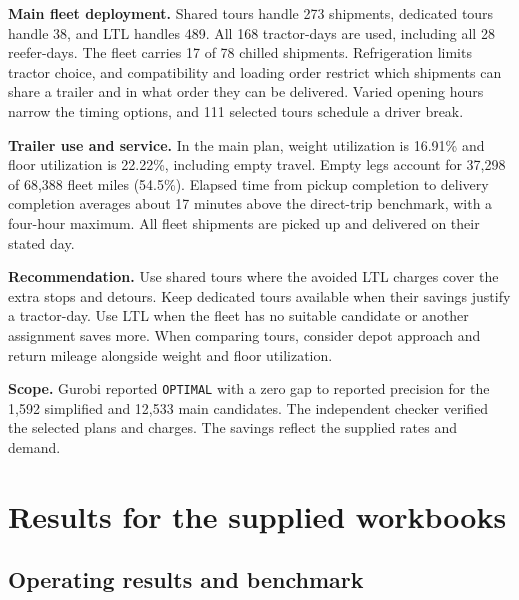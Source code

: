 \documentclass[11pt,letterpaper]{article}
\newcommand{\code}[1]{\texttt{#1}}
\begin{document}
\textbf{Main fleet deployment.} Shared tours handle 273 shipments,
dedicated tours handle 38, and LTL handles 489. All 168 tractor-days
are used, including all 28 reefer-days. The fleet carries 17 of 78
chilled shipments. Refrigeration limits tractor choice, and
compatibility and loading order restrict which shipments can share
a trailer and in what order they can be delivered. Varied opening
hours narrow the timing options, and 111 selected tours schedule a
driver break.

\textbf{Trailer use and service.} In the main plan, weight utilization
is 16.91\% and floor utilization is 22.22\%, including empty travel.
Empty legs account for 37,298 of 68,388 fleet miles (54.5\%).
Elapsed time from pickup completion to delivery completion averages
about 17 minutes above the direct-trip benchmark, with a four-hour
maximum. All fleet shipments are picked up and delivered on their
stated day.

\textbf{Recommendation.} Use shared tours where the avoided LTL
charges cover the extra stops and detours. Keep dedicated tours
available when their savings justify a tractor-day. Use LTL when
the fleet has no suitable candidate or another assignment saves
more. When comparing tours, consider depot approach and return
mileage alongside weight and floor utilization.

\textbf{Scope.} Gurobi reported \code{OPTIMAL} with a zero gap to
reported precision for the 1,592 simplified and 12,533 main
candidates. The independent checker verified the selected plans
and charges. The savings reflect the supplied rates and demand.

\clearpage
\appendix
\section{Results for the supplied workbooks}\label{app:results}

\subsection*{Operating results and benchmark}
\end{document}

